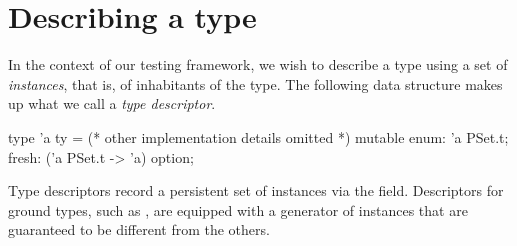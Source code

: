 
\section{Describing a type}
\label{sec:representation}

In the context of our testing framework, we wish to describe a type using a set
of \emph{instances}, that is, of inhabitants of the type. The following data
structure makes up what we call a \emph{type descriptor}.

\begin{ocamlcode}
type 'a ty = {
  (* other implementation details omitted *)
  mutable enum: 'a PSet.t;
  fresh: ('a PSet.t -> 'a) option;
}
\end{ocamlcode}

Type descriptors record a persistent set of instances via the 
field. Descriptors for ground types, such as , are equipped with a
generator of  instances that are guaranteed to be different from the
others.
